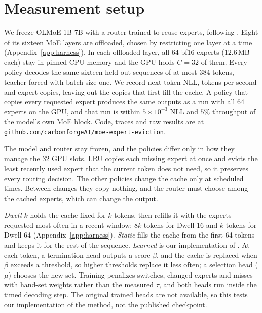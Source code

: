 \documentclass{article}
\begin{document}
\vspace{-4pt}
\section{Measurement setup}
\label{sec:setup}
\vspace{-2pt}
We freeze OLMoE-1B-7B \citep{muennighoff2024olmoe} with a router trained to
reuse experts, following \citet{remoe2026}. Eight of its sixteen MoE layers are
offloaded, chosen by restricting one layer at a time
(Appendix~\ref{app:harness}). In each offloaded layer, all 64 bf16 experts
($12.6$\,MB each) stay in pinned CPU memory and the GPU holds $C{=}32$ of them.
Every policy decodes the same sixteen held-out sequences of at most 384 tokens,
teacher-forced with batch size one. We record next-token NLL, tokens per
second and expert copies, leaving out the copies that first fill the cache. A
policy that copies every requested expert produces the same outputs as a run
with all 64 experts on the GPU, and that run is within $5\times10^{-3}$ NLL and
$5\%$ throughput of the model's own MoE block. Code, traces and raw results are
at
\href{https://github.com/carbonforgeAI/moe-expert-eviction}{\texttt{github.com/carbonforgeAI/moe-expert-eviction}}.

The model and router stay frozen, and the policies differ only in how they
manage the 32 GPU slots. LRU copies each missing expert at once and evicts the
least recently used expert that the current token does not need, so it
preserves every routing decision. The other policies change the cache only at
scheduled times. Between changes they copy nothing, and the router must choose
among the cached experts, which can change the output.

\emph{Dwell-$k$} holds the cache fixed for $k$ tokens, then refills it with the
experts requested most often in a recent window: $8k$ tokens for Dwell-16 and
$k$ tokens for Dwell-64 (Appendix~\ref{app:harness}). \emph{Static} fills the
cache from the first 64 tokens and keeps it for the rest of the sequence.
\emph{Learned} is our implementation of \citet{shen2026temporally}. At each
token, a termination head outputs a score $\beta$, and the cache is replaced
when $\beta$ exceeds a threshold, so higher thresholds replace it less often;
a selection head ($\mu$) chooses the new set. Training penalizes switches,
changed experts and misses with hand-set weights rather than the measured
$\tau$, and both heads run inside the timed decoding step. The original trained
heads are not available, so this tests our implementation of the method, not
the published checkpoint.
\end{document}
